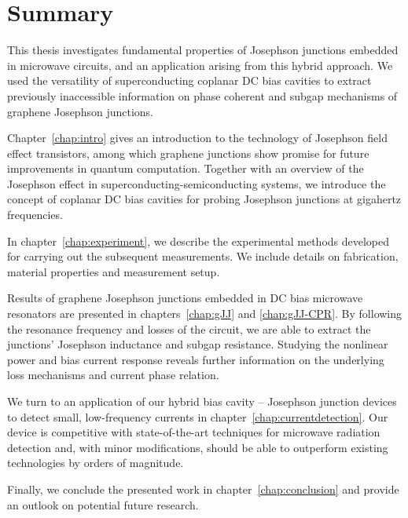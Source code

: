 \chapter*{Summary}

This thesis investigates fundamental properties of Josephson junctions embedded in microwave circuits, and an application arising from this hybrid approach.
%
We used the versatility of superconducting coplanar DC bias cavities to extract previously inaccessible information on phase coherent and subgap mechanisms of graphene Josephson junctions.

\noindent \newline
Chapter~\ref{chap:intro} gives an introduction to the technology of Josephson field effect transistors, among which graphene junctions show promise for future improvements in quantum computation.
%
Together with an overview of the Josephson effect in superconducting-semiconducting systems, we introduce the concept of coplanar DC bias cavities for probing Josephson junctions at gigahertz frequencies.

\noindent \newline
In chapter~\ref{chap:experiment}, we describe the experimental methods developed for carrying out the subsequent measurements.
%
We include details on fabrication, material properties and measurement setup.

\noindent \newline
Results of graphene Josephson junctions embedded in DC bias microwave resonators are presented in chapters~\ref{chap:gJJ} and \ref{chap:gJJ-CPR}.
%
By following the resonance frequency and losses of the circuit, we are able to extract the junctions' Josephson inductance and subgap resistance.
%
Studying the nonlinear power and bias current response reveals further information on the underlying loss mechanisms and current phase relation.

\noindent \newline
We turn to an application of our hybrid bias cavity -- Josephson junction devices to detect small, low-frequency currents in chapter~\ref{chap:currentdetection}.
%
Our device is competitive with state-of-the-art techniques for microwave radiation detection and, with minor modifications, should be able to outperform existing technologies by orders of magnitude.

\noindent \newline
Finally, we conclude the presented work in chapter~\ref{chap:conclusion} and provide an outlook on potential future research.

